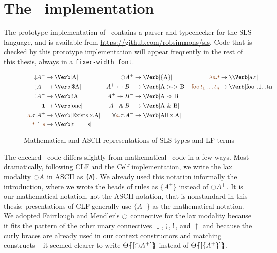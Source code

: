 \section{The \sls~implementation}
\label{sec:prototype}

The prototype implementation of \sls~contains a parser and typechecker
for the SLS language, and is available from
\url{https://github.com/robsimmons/sls}. Code that is checked by this
prototype implementation will appear frequently in the rest of this
thesis, always in a \verb|fixed-width font|.

\begin{figure}
\begin{align*}
{\downarrow}A^- & \rightarrow \mbox{\Verb|A|} 
 & {\ocircle}A^+ & \rightarrow \mbox{\Verb|\{A\}|}
 & \lf{\lambda a.t} & \rightarrow \mbox{{\texttt{\char`\\}}\Verb|a.t|}
\\
{\gnab}A^- & \rightarrow \mbox{\Verb|\$A|}
 & A^+ \lefti B^- & \rightarrow \mbox{\Verb|A >-> B|}
 & \lf{{\sf foo}\,t_1\ldots t_n} & \rightarrow \mbox{\Verb|foo t1...tn|}
\\
{!}A^- & \rightarrow \mbox{\Verb|!A|}
 & A^+ \righti B^- & \rightarrow \mbox{\Verb|A ->> B|}
\\
\one & \rightarrow \mbox{\Verb|one|}
 & A^- \with B^- & \rightarrow \mbox{\Verb|A \& B|}
\\
\exists \lf{a}.\tau. A^+ & \rightarrow \mbox{\Verb|Exists x.A|}
 & \forall \lf{a}.\tau. A^- & \rightarrow \mbox{\Verb|All x.A|}
\\
\lf{t} \doteq \lf{s} & \rightarrow \mbox{\Verb|t == s|}
\end{align*}
\caption{Mathematical and ASCII representations of SLS types and LF terms}
\label{fig:translate-types}
\end{figure}

The checked \sls~code differs slightly from mathematical \sls~code in
a few ways. Most dramatically, following CLF and the Celf
implementation, we write the lax modality ${\ocircle}A$ in ASCII as
\verb|{A}|. We already used this notation informally the introduction,
where we wrote the heads of rules as $\{ A^+ \}$ instead of
${\ocircle}A^+$. It is our mathematical notation, not the ASCII
notation, that is nonstandard in this thesis: presentations of CLF
generally use $\{ A^+ \}$ as the mathematical notation. We adopted
Fairtlough and Mendler's ${\ocircle}$ connective for the lax modality
\cite{fairtlough95propositional} because it fits the pattern of the
other unary connectives ${\downarrow}$, ${\gnab}$, ${{!}}$, and
${\uparrow}$ and because the curly braces are already used in our
context constructors and matching constructs -- it seemed clearer to
write ${\Theta}\mbox{$\{\hspace{-4pt}\{$}{[{\ocircle}A^+]}\mbox{$\}\hspace{-4pt}\}$}$ instead of
${\Theta}\mbox{$\{\hspace{-4pt}\{$}{[\{A^+\}]}\mbox{$\}\hspace{-4pt}\}$}$.


